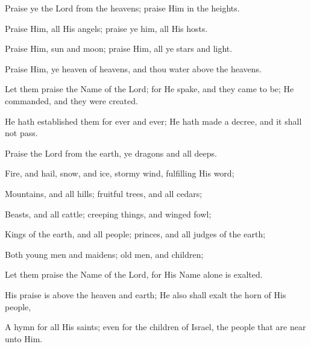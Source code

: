 Praise ye the Lord from the heavens; praise Him in the heights.

Praise Him, all His angels; praise ye him, all His hosts.

Praise Him, sun and moon; praise Him, all ye stars and light.

Praise Him, ye heaven of heavens, and thou water above the heavens.

Let them praise the Name of the Lord; for He spake, and they came to be; He commanded, and they were created.

He hath established them for ever and ever; He hath made a decree, and it shall not pass.

Praise the Lord from the earth, ye dragons and all deeps.

Fire, and hail, snow, and ice, stormy wind, fulfilling His word;

Mountains, and all hills; fruitful trees, and all cedars;

Beasts, and all cattle; creeping things, and winged fowl;

Kings of the earth, and all people; princes, and all judges of the earth;

Both young men and maidens; old men, and children;

Let them praise the Name of the Lord, for His Name alone is exalted.

His praise is above the heaven and earth; He also shall exalt the horn of His people,

A hymn for all His saints; even for the children of Israel, the people that are near unto Him.
